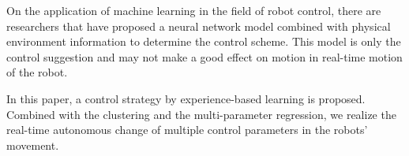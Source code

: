 On the application of machine learning in the field of robot control, there are researchers that have proposed a neural network model combined with physical environment information to determine the control scheme\cite{InformationDriven}\cite{NovelPlasticityRule}\cite{MissileSystems}\cite{NeuroFuzzyBayesian}. This model is only the control suggestion and may not make a good effect on motion in real-time motion of the robot. 

In this paper, a control strategy by experience-based learning  is proposed. Combined with the clustering\cite{Cluseter_ICT}\cite{KmeansAndDeepLearning} and the multi-parameter regression, we realize the real-time autonomous change of multiple control parameters in the robots' movement.
